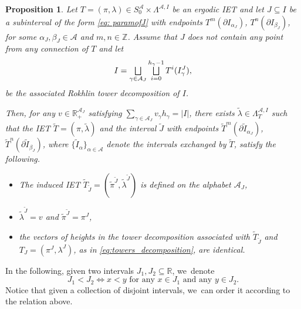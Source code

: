 \documentclass[JEP,XML,SOM,Unicode,NoEqCountersInSection,NoFloatCountersInSection,published]{cedram}
\let\oldbigsqcup\bigsqcup
\renewcommand{\bigsqcup}{\mathop{\textstyle\oldbigsqcup}\displaylimits}
\theoremstyle{plain}
\newtheorem{proposition}[theorem]{Proposition}
\theoremstyle{definition}
\newcommand{\A}{\mathcal{A}}
\newcommand{\Z}{\mathbb{Z}}
\newcommand{\R}{\mathbb{R}}
\begin{document}
\begin{proposition}
\label{prop: unwinding}
Let $T = (\pi, \lambda) \in S_0^\A \times \Lambda^{\A, I}$ be an ergodic IET and let $J \subseteq I$ be a subinterval of the form \eqref{eq: paramofJ} with endpoints $T^{m}(\partial I_{\alpha_J})$, $T^n(\partial I_{\beta_J})$, for some $\alpha_J, \beta_J \in \A$ and $m, n \in \Z$. Assume that $J$ does not contain any point from any connection of $T$ and let
\begin{equation}
\label{eq:initial_towers}
I = \bigsqcup_{\gamma \in \A_J} \bigsqcup_{i = 0}^{h_\gamma - 1} T^i(I_\gamma^J),
\end{equation}
be the associated Rokhlin tower decomposition of $I$.

Then, for any $v \in \R^{\A_J}_+$ satisfying $\sum_{\gamma \in \A_J} v_\gamma h_\gamma = |I|$, there exists $\tilde \lambda \in \Lambda^{\A, I}_T$ such that the IET $\tilde T = (\pi, \tilde \lambda)$ and the interval $\tilde J$ with endpoints $\tilde T^{m}(\partial \tilde I_{\alpha_J})$, $\tilde T^n(\partial \tilde I_{\beta_J})$, where $\{\tilde I_\alpha\}_{\alpha \in \A}$ denote the intervals exchanged by $\tilde T$, satisfy the following.
\begin{itemize}
\item The induced IET $\tilde T_{\tilde J}= (\tilde \pi ^{\tilde J}, \tilde \lambda ^{\tilde J})$ is defined on the alphabet $\A_J$,
\item $\tilde \lambda^{\tilde J} = v$ and $\tilde \pi^{\tilde J} = \pi^J$,
\item {the vectors of heights in the tower decomposition associated with $\tilde T_{\tilde J}$ and $T_J = (\pi^J, \lambda^J)$, as in \eqref{eq:towers_decomposition}, are identical.}
\end{itemize}
\end{proposition}

In the following, given two intervals $J_1, J_2 \subseteq \R$, we~denote
\begin{equation}\label{eq: defofintervalorder}
J_1<J_2\iff x<y \text{ for any }x\in J_1\text{ and any }y\in J_2.
\end{equation}
Notice that given a collection of disjoint intervals, we~can order it according to the relation above.
\end{document}
